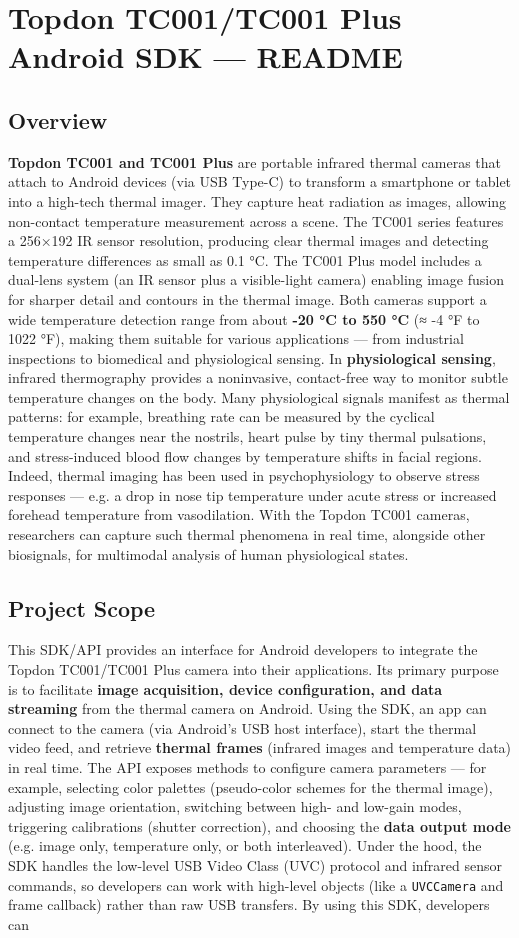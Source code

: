 \chapter{Topdon TC001/TC001 Plus Android SDK --- README} \section{Overview} \textbf{Topdon TC001 and TC001 Plus} are portable infrared thermal cameras that attach to Android devices (via USB Type-C) to transform a smartphone or tablet into a high-tech thermal imager. They capture heat radiation as images, allowing non-contact temperature measurement across a scene. The TC001 series features a 256×192 IR sensor resolution, producing clear thermal images and detecting temperature differences as small as 0.1 °C. The TC001 Plus model includes a dual-lens system (an IR sensor plus a visible-light camera) enabling image fusion for sharper detail and contours in the thermal image. Both cameras support a wide temperature detection range from about \textbf{-20 °C to 550 °C} (≈ -4 °F to 1022 °F), making them suitable for various applications --- from industrial inspections to biomedical and physiological sensing. In \textbf{physiological sensing}, infrared thermography provides a noninvasive, contact-free way to monitor subtle temperature changes on the body. Many physiological signals manifest as thermal patterns: for example, breathing rate can be measured by the cyclical temperature changes near the nostrils, heart pulse by tiny thermal pulsations, and stress-induced blood flow changes by temperature shifts in facial regions. Indeed, thermal imaging has been used in psychophysiology to observe stress responses --- e.g. a drop in nose tip temperature under acute stress or increased forehead temperature from vasodilation. With the Topdon TC001 cameras, researchers can capture such thermal phenomena in real time, alongside other biosignals, for multimodal analysis of human physiological states. \section{Project Scope} This SDK/API provides an interface for Android developers to integrate the Topdon TC001/TC001 Plus camera into their applications. Its primary purpose is to facilitate \textbf{image acquisition, device configuration, and data streaming} from the thermal camera on Android. Using the SDK, an app can connect to the camera (via Android's USB host interface), start the thermal video feed, and retrieve \textbf{thermal frames} (infrared images and temperature data) in real time. The API exposes methods to configure camera parameters --- for example, selecting color palettes (pseudo-color schemes for the thermal image), adjusting image orientation, switching between high- and low-gain modes, triggering calibrations (shutter correction), and choosing the \textbf{data output mode} (e.g. image only, temperature only, or both interleaved). Under the hood, the SDK handles the low-level USB Video Class (UVC) protocol and infrared sensor commands, so developers can work with high-level objects (like a \texttt{UVCCamera} and frame callback) rather than raw USB transfers. By using this SDK, developers can 